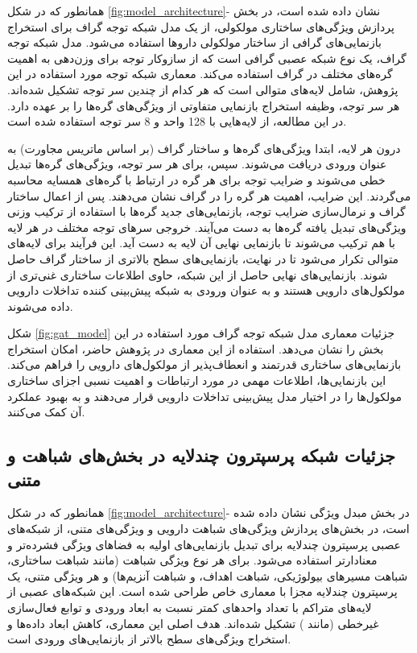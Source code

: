 همانطور که در شکل \ref{fig:model_architecture}- نشان داده شده است، در بخش پردازش ویژگی‌های ساختاری مولکولی، از یک مدل شبکه توجه گراف برای استخراج بازنمایی‌های گرافی از ساختار مولکولی داروها استفاده می‌شود. مدل شبکه توجه گراف، یک نوع شبکه عصبی گرافی است که از سازوکار توجه برای وزن‌دهی به اهمیت گره‌های مختلف در گراف استفاده می‌کند. معماری شبکه توجه مورد استفاده در این پژوهش، شامل لایه‌های متوالی است که هر کدام از چندین سر توجه تشکیل شده‌اند. هر سر توجه، وظیفه استخراج بازنمایی متفاوتی از ویژگی‌های گره‌ها را بر عهده دارد. در این مطالعه، از لایه‌هایی با 128 واحد و 8 سر توجه استفاده شده است.

درون هر لایه، ابتدا ویژگی‌های گره‌ها و ساختار گراف (بر اساس ماتریس مجاورت) به عنوان ورودی دریافت می‌شوند. سپس، برای هر سر توجه، ویژگی‌های گره‌ها تبدیل خطی می‌شوند و ضرایب توجه برای هر گره در ارتباط با گره‌های همسایه محاسبه می‌گردند. این ضرایب، اهمیت هر گره را در گراف نشان می‌دهند. پس از اعمال ساختار گراف و نرمال‌سازی ضرایب توجه، بازنمایی‌های جدید گره‌ها با استفاده از ترکیب وزنی ویژگی‌های تبدیل یافته گره‌ها به دست می‌آیند. خروجی سرهای توجه مختلف در هر لایه با هم ترکیب می‌شوند تا بازنمایی نهایی آن لایه به دست آید. این فرآیند برای لایه‌های متوالی تکرار می‌شود تا در نهایت، بازنمایی‌های سطح بالاتری از ساختار گراف حاصل شوند. بازنمایی‌های نهایی حاصل از این شبکه، حاوی اطلاعات ساختاری غنی‌تری از مولکول‌های دارویی هستند و به عنوان ورودی به شبکه پیش‌بینی کننده تداخلات دارویی داده می‌شوند. 

شکل \ref{fig:gat_model} جزئیات معماری مدل شبکه توجه گراف مورد استفاده در این بخش را نشان می‌دهد. استفاده از این معماری در پژوهش حاضر، امکان استخراج بازنمایی‌های ساختاری قدرتمند و انعطاف‌پذیر از مولکول‌های دارویی را فراهم می‌کند. این بازنمایی‌ها، اطلاعات مهمی در مورد ارتباطات و اهمیت نسبی اجزای ساختاری مولکول‌ها را در اختیار مدل پیش‌بینی تداخلات دارویی قرار می‌دهند و به بهبود عملکرد آن کمک می‌کنند.

\subsection{جزئیات شبکه‌ پرسپترون چندلایه در بخش‌های شباهت و متنی}

همانطور که در شکل \ref{fig:model_architecture}- در بخش مبدل ویژگی نشان داده شده است، در بخش‌های پردازش ویژگی‌های شباهت دارویی و ویژگی‌های متنی، از شبکه‌های عصبی پرسپترون چندلایه برای تبدیل بازنمایی‌های اولیه به فضاهای ویژگی فشرده‌تر و معنادارتر استفاده می‌شود. برای هر نوع ویژگی شباهت (مانند شباهت ساختاری، شباهت مسیرهای بیولوژیکی، شباهت اهداف، و شباهت آنزیم‌ها) و هر ویژگی متنی، یک پرسپترون چندلایه مجزا با معماری خاص طراحی شده است. این شبکه‌های عصبی از لایه‌های متراکم با تعداد واحدهای کمتر نسبت به ابعاد ورودی و توابع فعال‌سازی غیرخطی (مانند ) تشکیل شده‌اند. هدف اصلی این معماری، کاهش ابعاد داده‌ها و استخراج ویژگی‌های سطح بالاتر از بازنمایی‌های ورودی است.

